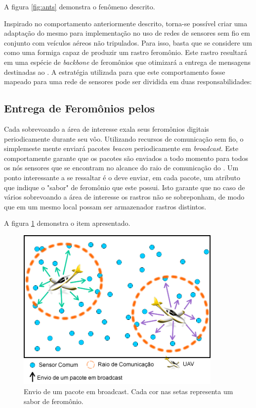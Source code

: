 A figura \ref{fig:ants} demonstra o fenômeno descrito.



Inspirado no comportamento anteriormente descrito, torna-se possível criar uma adaptação do mesmo para implementação no uso de redes de sensores sem fio em conjunto com veículos aéreos não tripulados. Para isso, basta que se considere um \vant como uma formiga capaz de produzir um rastro feromônio. Este rastro resultará em uma espécie de \emph{backbone} de feromônios que otimizará a entrega de mensagens destinadas ao \vant. A estratégia utilizada para que este comportamento fosse mapeado para uma rede de sensores pode ser dividida em duas responsabilidades:

\subsection{Entrega de Feromônios pelos \vants}
Cada \vant sobrevoando a área de interesse exala seus feromônios digitais periodicamente durante seu vôo. Utilizando recursos de comunicação sem fio, o \vant simplemeste mente enviará pacotes \emph{beacon} periodicamente em \emph{broadcast}. Este comportamente garante que os pacotes são enviados a todo momento para todos os nós sensores que se encontram no alcance do raio de comunicação do \vant. Um ponto interessante a se ressaltar é o \vant deve enviar, em cada pacote, um atributo que indique o "sabor" de feromônio que este \vant possui. Isto garante que no caso de vários \vants sobrevoando a área de interesse os rastros não se sobreponham, de modo que em um mesmo local possam ser armazenador rastros distintos.

A figura \ref{fig:broadcast} demonstra o item apresentado.

 \begin{figure}[h!]
 \centering
 \includegraphics[width=10cm]{pictures/broadcast.png}
 \caption{Envio de um pacote em broadcast. Cada cor nas setas representa um sabor de feromônio.}
  \label{fig:broadcast}
 \end{figure}

